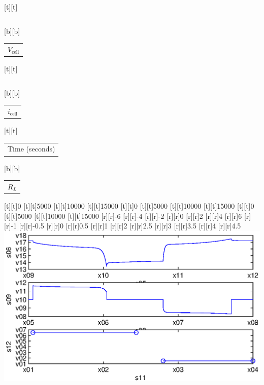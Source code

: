 %    
%
%
\begin{psfrags}%
\psfragscanon%
%
[t][t]{\color[rgb]{0,0,0}\setlength{\tabcolsep}{0pt}\begin{tabular}{c}\end{tabular}}%
[b][b]{\color[rgb]{0,0,0}\setlength{\tabcolsep}{0pt}\begin{tabular}{c}$V_\text{cell}$\end{tabular}}%
[t][t]{\color[rgb]{0,0,0}\setlength{\tabcolsep}{0pt}\begin{tabular}{c}\end{tabular}}%
[b][b]{\color[rgb]{0,0,0}\setlength{\tabcolsep}{0pt}\begin{tabular}{c}$i_\text{cell}$\end{tabular}}%
[t][t]{\color[rgb]{0,0,0}\setlength{\tabcolsep}{0pt}\begin{tabular}{c}Time (seconds)\end{tabular}}%
[b][b]{\color[rgb]{0,0,0}\setlength{\tabcolsep}{0pt}\begin{tabular}{c}$R_L$\end{tabular}}%
%
[t][t]{0}%
[t][t]{5000}%
[t][t]{10000}%
[t][t]{15000}%
[t][t]{0}%
[t][t]{5000}%
[t][t]{10000}%
[t][t]{15000}%
[t][t]{0}%
[t][t]{5000}%
[t][t]{10000}%
[t][t]{15000}%
%
[r][r]{-6}%
[r][r]{-4}%
[r][r]{-2}%
[r][r]{0}%
[r][r]{2}%
[r][r]{4}%
[r][r]{6}%
[r][r]{-1}%
[r][r]{-0.5}%
[r][r]{0}%
[r][r]{0.5}%
[r][r]{1}%
[r][r]{2}%
[r][r]{2.5}%
[r][r]{3}%
[r][r]{3.5}%
[r][r]{4}%
[r][r]{4.5}%
%
\includegraphics[width=15cm]{batt_load_exp.eps}%
\end{psfrags}%
%
